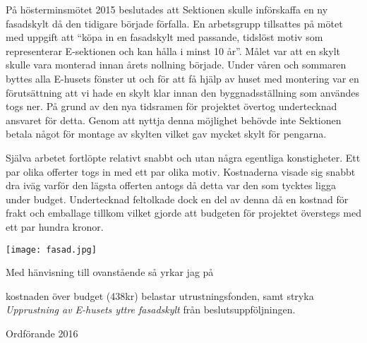 \documentclass[../_main/handlingar.tex]{subfiles}
\begin{document}

På hösterminsmötet 2015 beslutades att Sektionen skulle införskaffa en ny fasadskylt då den tidigare började förfalla. En arbetsgrupp tillsattes på mötet med uppgift att “köpa in en fasadskylt med passande, tidslöst motiv som representerar E-sektionen och kan hålla i minst 10 år”. Målet var att en skylt skulle vara monterad innan årets nollning började. Under våren och sommaren byttes alla E-husets fönster ut och för att få hjälp av huset med montering var en förutsättning att vi hade en skylt klar innan den byggnadsställning som användes togs ner. På grund av den nya tidsramen för projektet övertog undertecknad ansvaret för detta. Genom att nyttja denna möjlighet behövde inte Sektionen betala något för montage av skylten vilket gav mycket skylt för pengarna.

Själva arbetet fortlöpte relativt snabbt och utan några egentliga konstigheter. Ett par olika offerter togs in med ett par olika motiv. Kostnaderna visade sig snabbt dra iväg varför den lägsta offerten antogs då detta var den som tycktes ligga under budget. Undertecknad feltolkade dock en del av denna då en kostnad för frakt och emballage tillkom vilket gjorde att budgeten för projektet överstegs med ett par hundra kronor.

\begin{center}
\texttt{[image: fasad.jpg]}
\end{center}

Med hänvisning till ovanstående så yrkar jag på

\begin{attsatser}
    \att kostnaden över budget (438kr) belastar utrustningsfonden, samt
    \att stryka \emph{Upprustning av E-husets yttre fasadskylt} från beslutsuppföljningen.
\end{attsatser}

\begin{signatures}{1}
    \mvh
    \signature{Fredrik Peterson}{Ordförande 2016}
\end{signatures}
\end{document}
